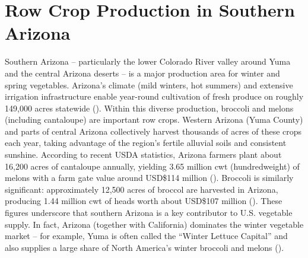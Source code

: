 \documentclass[letterpaper]{report}
\begin{document}
\section{Row Crop Production in Southern Arizona}

Southern Arizona – particularly the lower Colorado River valley around Yuma and the central Arizona deserts – is a major production area for winter and spring vegetables. Arizona’s climate (mild winters, hot summers) and extensive irrigation infrastructure enable year-round cultivation of fresh produce on roughly 149,000 acres statewide (\cite{Arizona-Department-of-Agriculture2018-dx}). Within this diverse production, broccoli and melons (including cantaloupe) are important row crops. Western Arizona (Yuma County) and parts of central Arizona collectively harvest thousands of acres of these crops each year, taking advantage of the region’s fertile alluvial soils and consistent sunshine. According to recent USDA statistics, Arizona farmers plant about 16,200 acres of cantaloupe annually, yielding 3.65 million cwt (hundredweight) of melons with a farm gate value around USD\$114 million (\cite{Arizona-Department-of-Agriculture2018-dx}). Broccoli is similarly significant: approximately 12,500 acres of broccol are harvested in Arizona, producing 1.44 million cwt of heads worth about USD\$107 million (\cite{Arizona-Department-of-Agriculture2018-dx}). These figures underscore that southern Arizona is a key contributor to U.S. vegetable supply. In fact, Arizona (together with California) dominates the winter vegetable market – for example, Yuma is often called the “Winter Lettuce Capital” and also supplies a large share of North America’s winter broccoli and melons (\cite{Arizona-Department-of-Agriculture2018-dx}).
\end{document}
